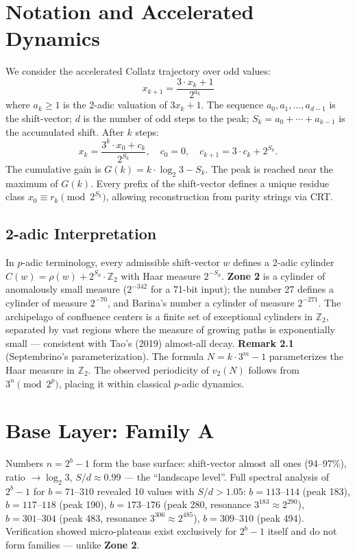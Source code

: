 \documentclass[12pt,a4paper]{article}
\theoremstyle{remark}
\begin{document}
\section{Notation and Accelerated Dynamics}
We consider the accelerated Collatz trajectory over odd values:
\begin{equation}
x_{k+1} = \frac{3 \cdot x_k + 1}{2^{a_k}}
\end{equation}
where $a_k \ge 1$ is the 2-adic valuation of $3x_k + 1$. The sequence $a_0, a_1, \dots, a_{d-1}$ is the shift-vector; $d$ is the number of odd steps to the peak; $S_k = a_0 + \cdots + a_{k-1}$ is the accumulated shift. After $k$ steps:
\begin{equation}
x_k = \frac{3^k \cdot x_0 + c_k}{2^{S_k}}, \quad c_0 = 0, \quad c_{k+1} = 3 \cdot c_k + 2^{S_k}.
\end{equation}
The cumulative gain is $G(k) = k \cdot \log_2 3 - S_k$. The peak is reached near the maximum of $G(k)$. Every prefix of the shift-vector defines a unique residue class $x_0 \equiv r_k \pmod{2^{S_k}}$, allowing reconstruction from parity strings via CRT.

\subsection{2-adic Interpretation}
In $p$-adic terminology, every admissible shift-vector $w$ defines a 2-adic cylinder $C(w) = \rho(w) + 2^{S_d} \cdot \mathbb{Z}_2$ with Haar measure $2^{-S_d}$. \textbf{Zone 2} is a cylinder of anomalously small measure ($2^{-342}$ for a 71-bit input); the number 27 defines a cylinder of measure $2^{-70}$, and Barina's number a cylinder of measure $2^{-271}$. The archipelago of confluence centers is a finite set of exceptional cylinders in $\mathbb{Z}_2$, separated by vast regions where the measure of growing paths is exponentially small --- consistent with Tao's (2019) almost-all decay.
\smallskip
\noindent\textbf{Remark 2.1} (Septembrino's parameterization).
The formula $N = k \cdot 3^m - 1$ parameterizes the Haar measure in $\mathbb{Z}_2$. The observed periodicity of $v_2(N)$ follows from $3^n \pmod{2^p}$, placing it within classical $p$-adic dynamics.

\section{Base Layer: Family A}
Numbers $n = 2^b - 1$ form the base surface: shift-vector almost all ones (94--97\%), ratio $\to \log_2 3$, $S/d \approx 0.99$ --- the ``landscape level''. Full spectral analysis of $2^b - 1$ for $b = 71\text{--}310$ revealed 10 values with $S/d > 1.05$: $b=113\text{--}114$ (peak 183), $b=117\text{--}118$ (peak 190), $b=173\text{--}176$ (peak 280, resonance $3^{183}\approx2^{290}$), $b=301\text{--}304$ (peak 483, resonance $3^{306}\approx2^{485}$), $b=309\text{--}310$ (peak 494). Verification showed micro-plateaus exist exclusively for $2^b-1$ itself and do not form families --- unlike \textbf{Zone 2}.
\end{document}

